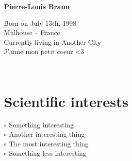 \documentclass[a4paper,10pt]{article}
\begin{document}
\thispagestyle{empty}

\begin{adjustbox}{valign=t}
\begin{minipage}{0.3\textwidth} %
\begin{center}

\MySkip 	%

{\LARGE \bfseries Pierre-Louis Braun}

\MySkip 	%

Born on July 13th, 1998\\
Mulhouse -- France\\
Currently living in Another City\\
J'aime mon petit coeur <3\\

\MySkip 	%

\textcolor{ColorTwo}{\faEnvelopeO} 
 \\

\textcolor{ColorTwo}{\faChain} 
\end{center}

\vfill

\section*{Scientific interests}
\raggedright
\textcolor{ColorOne}{$\circ$} Something interesting\\
\textcolor{ColorOne}{$\circ$} Another interesting thing\\
\textcolor{ColorOne}{$\circ$} The most interesting thing\\
\textcolor{ColorOne}{$\circ$} Something less interesting


\end{minipage}
\end{adjustbox}
\end{document}

